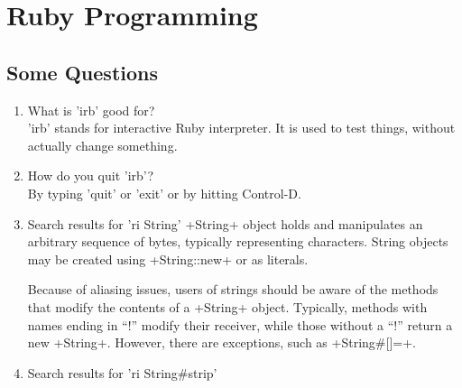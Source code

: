 \documentclass[10pt,a4paper]{scrartcl}
\begin{document}
\section{Ruby Programming}

\subsection{Some Questions}
\begin{enumerate}
\item{What is 'irb' good for?} \\
'irb' stands for interactive Ruby interpreter. It is used to test things, without actually change something.
\item{How do you quit 'irb'?} \\
By typing 'quit' or 'exit' or by hitting Control-D.
\item{Search results for 'ri String'}
 +String+ object holds and manipulates an arbitrary sequence of
     bytes, typically representing characters. String objects may be
     created using +String::new+ or as literals.

     Because of aliasing issues, users of strings should be aware of the
     methods that modify the contents of a +String+ object. Typically,
     methods with names ending in ``!'' modify their receiver, while
     those without a ``!'' return a new +String+. However, there are
     exceptions, such as +String\#[]=+.

\item{Search results for 'ri String\#strip'}\\


\end{enumerate}
\end{document}
